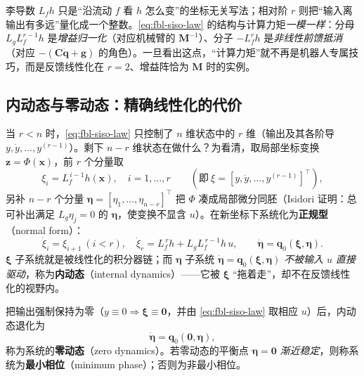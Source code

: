\begin{insight}
李导数 $L_f h$ 只是“沿流动 $f$ 看 $h$ 怎么变”的坐标无关写法；相对阶 $r$ 则把“输入离输出有多远”量化成一个整数。\cref{eq:fbl-siso-law} 的结构与计算力矩\emph{一模一样}：分母 $L_g L_f^{r-1}h$ 是\emph{增益归一化}（对应机械臂的 $\mathbf{M}^{-1}$）、分子 $-L_f^r h$ 是\emph{非线性前馈抵消}（对应 $-(\mathbf{C}\dot{\mathbf{q}}+\mathbf{g})$ 的角色）。一旦看出这点，“计算力矩”就不再是机器人专属技巧，而是反馈线性化在 $r=2$、增益阵恰为 $\mathbf{M}$ 时的实例。
\end{insight}

\subsection{内动态与零动态：精确线性化的代价}
\label{sec:fbl-zero-dynamics}

当 $r<n$ 时，\cref{eq:fbl-siso-law} 只控制了 $n$ 维状态中的 $r$ 维（输出及其各阶导 $y,\dot y,\dots,y^{(r-1)}$）。剩下 $n-r$ 维状态在做什么？为看清，取局部坐标变换 $\mathbf{z}=\Phi(\mathbf{x})$，前 $r$ 个分量取
\begin{equation}
  \xi_i=L_f^{\,i-1} h(\mathbf{x}),\quad i=1,\dots,r\qquad(\text{即}\ \xi=[y,\dot y,\dots,y^{(r-1)}]^\top),
  \label{eq:fbl-xi}
\end{equation}
另补 $n-r$ 个分量 $\boldsymbol{\eta}=[\eta_1,\dots,\eta_{n-r}]^\top$ 把 $\Phi$ 凑成局部微分同胚（Isidori 证明：总可补出满足 $L_g\eta_j=0$ 的 $\boldsymbol{\eta}$，使变换不显含 $u$）。在新坐标下系统化为\textbf{正规型}（normal form）：
\begin{equation}
  \dot{\xi}_i=\xi_{i+1}\ (i<r),\quad \dot{\xi}_r=L_f^{\,r}h+L_gL_f^{\,r-1}h\,u,\qquad
  \boxed{\dot{\boldsymbol{\eta}}=\mathbf{q}_0(\boldsymbol{\xi},\boldsymbol{\eta})}.
  \label{eq:fbl-normal-form}
\end{equation}
$\boldsymbol{\xi}$ 子系统就是被线性化的积分器链；而 $\boldsymbol{\eta}$ 子系统 $\dot{\boldsymbol{\eta}}=\mathbf{q}_0(\boldsymbol{\xi},\boldsymbol{\eta})$ \emph{不被输入 $u$ 直接驱动}，称为\textbf{内动态}（internal dynamics）——它被 $\boldsymbol{\xi}$ “拖着走”，却不在反馈线性化的视野内。

\begin{definition}[零动态与最小相位]
\label{def:fbl-zero-dynamics}
把输出强制保持为零（$y\equiv0\Rightarrow\boldsymbol{\xi}\equiv\mathbf{0}$，并由 \cref{eq:fbl-siso-law} 取相应 $u$）后，内动态退化为
\begin{equation}
  \dot{\boldsymbol{\eta}}=\mathbf{q}_0(\mathbf{0},\boldsymbol{\eta}),
  \label{eq:fbl-zd}
\end{equation}
称为系统的\textbf{零动态}（zero dynamics）。若零动态的平衡点 $\boldsymbol{\eta}=\mathbf{0}$ \emph{渐近稳定}，则称系统为\textbf{最小相位}（minimum phase）；否则为非最小相位。
\end{definition}

